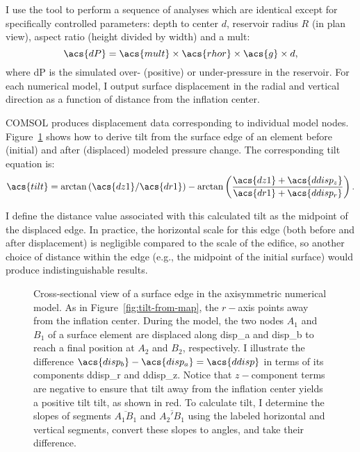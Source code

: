 I use the  tool to perform a sequence of analyses which are identical except for specifically controlled parameters: depth to center $d$, reservoir radius $R$ (in plan view), aspect ratio (height divided by width) and a \ac{mult}:
\begin{equation}
    \acs{dP}=\acs{mult}\times\acs{rhor}\times\acs{g}\times d,
\end{equation}
where \acs{dP} is the simulated over- (positive) or under-pressure in the reservoir. For each numerical model, I output surface displacement in the radial and vertical direction as a function of distance from the inflation center.

COMSOL produces displacement data corresponding to individual model nodes. Figure~\ref{fig:tilt-from-model} shows how to derive tilt from the surface edge of an element before (initial) and after (displaced) modeled pressure change. The corresponding tilt equation is:
\begin{equation}
    \acs{tilt} = \arctan\left({\acs{dz1}}/{\acs{dr1}}\right) - \arctan\left(\dfrac{\acs{dz1}+\acs{ddisp_z}}{\acs{dr1}+\acs{ddisp_r}}\right).\label{eq:tilt-from-model}
\end{equation}

I define the distance value associated with this calculated tilt as the midpoint of the displaced edge. In practice, the horizontal scale for this edge (both before and after displacement) is negligible compared to the scale of the edifice, so another choice of distance within the edge (e.g., the midpoint of the initial surface) would produce indistinguishable results.

\begin{figure}
    \caption[Tilt from numerical modeling]{Cross-sectional view of a surface edge in the axisymmetric numerical model. As in Figure~\ref{fig:tilt-from-map}, the $r-$axis points away from the inflation center. During the model, the two nodes $A_1$ and $B_1$ of a surface element are displaced along \acs{disp_a} and \acs{disp_b} to reach a final position at $A_2$ and $B_2$, respectively. I illustrate the difference $\acs{disp_b} - \acs{disp_a} = \acs{ddisp}$ in terms of its components \acs{ddisp_r} and \acs{ddisp_z}. Notice that $z-$component terms are negative to ensure that tilt away from the inflation center yields a positive tilt \acs{tilt}, as shown in red. To calculate \acs{tilt}, I determine the slopes of segments $\overline{A_1B_1}$ and $\overline{A_2'B_1}$ using the labeled horizontal and vertical segments, convert these slopes to angles, and take their difference.}%
    \label{fig:tilt-from-model}%
\end{figure}

